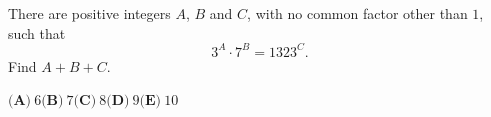 There are positive integers $A$, $B$ and $C$, with no common factor other than $1$, such that
\[3^A\cdot7^B=1323^C.\]
Find $A+B+C$.

$\textbf{(A)}\ 6$\qquad$\textbf{(B)}\ 7$\qquad$\textbf{(C)}\ 8$\qquad$\textbf{(D)}\ 9$\qquad$\textbf{(E)}\ 10$
